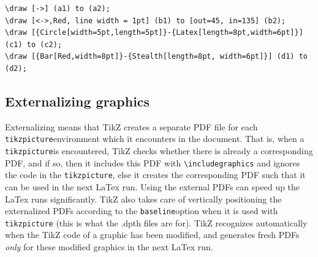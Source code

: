 \documentclass[10pt,letterpaper,twoside,notitlepage]{article}
\numberwithin{figure}{section}
\begin{document}
\noindent
\begin{minipage}{0.87\linewidth}
\brocol\begin{verbatim}
\draw [->] (a1) to (a2);
\draw [<->,Red, line width = 1pt] (b1) to [out=45, in=135] (b2);
\draw [{Circle[width=5pt,length=5pt]}-{Latex[length=8pt,width=6pt]}] (c1) to (c2);
\draw [{Bar[Red,width=8pt]}-{Stealth[length=8pt, width=6pt]}] (d1) to (d2);
\end{verbatim}\txcol
\end{minipage}
%
\begin{minipage}{0.12\linewidth}
\end{minipage}
%
\subsection{Externalizing graphics}
\label{Apx_tikzbasics_externalize}
%
\noindent
Externalizing means that TikZ creates a separate PDF file
for each \brocol\verb$tikzpicture$\txcol environment
which it encounters in the document.
That is, when a \brocol\verb$tikzpicture$\txcol is encountered,
TikZ checks whether there is already a corresponding PDF,
and if so, then it includes this PDF with \brocol\verb$\includegraphics$\txcol
and ignores the code in the \brocol\verb$tikzpicture$\txcol,
else it creates the corresponding PDF such that it can be used
in the next LaTex run.
Using the external PDFs can speed up the LaTex runs significantly.
TikZ also takes care of vertically positioning the externalized PDFs
according to the \brocol\verb$baseline$\txcol option
when it is used with \brocol\verb$tikzpicture$\txcol
(this is what the .dpth files are for).
TikZ recognizes automatically when the TikZ code of a graphic has been modified,
and generates fresh PDFs \emph{only} for these modified graphics in the next LaTex run.
\end{document}
